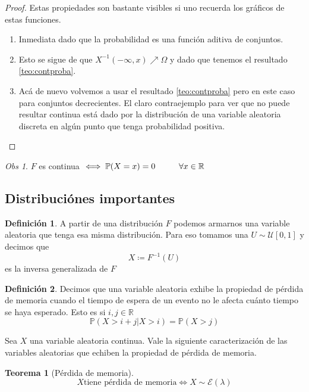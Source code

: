 \documentclass[11pt]{article}
\theoremstyle{plain} %
\newtheorem{teorema}{\color{rojo}Teorema}
\theoremstyle{definition}
\newtheorem*{definicion}{Definici\'{o}n} %
\theoremstyle{remark}
\newtheorem{obs}{Obs}
\def\Om{\Omega}
\def\R{\mathbb{R}}
\def\P{\mathbb{P}}
\def\va{variable aleatoria }
\def\vas{variables aleatorias }
\def\blue{\textcolor{blue!60!black}}
\begin{document}
\begin{proof}
Estas propiedades son bastante visibles si uno recuerda los gr\'aficos de estas funciones.
	\begin{enumerate}
		\item Inmediata dado que la probabilidad es una funci\'on aditiva de conjuntos.
		\item Esto se sigue de que $X^{-1}(-\infty, x) \nearrow \Om$ y dado que tenemos el resultado \ref{teo:contproba}.
		\item Ac\'a de nuevo volvemos a usar el resultado \ref{teo:contproba} pero en este caso para conjuntos decrecientes. El claro contraejemplo para ver que no puede resultar continua est\'a dado por la distribuci\'on de una \va discreta en alg\'un punto que tenga probabilidad positiva.
	\end{enumerate}
\end{proof}

\begin{obs}
	$F$ es continua $\iff \P(X=x) = 0 \hskip 1cm \forall x \in \R$ 
\end{obs}

\bigskip

\subsection{Distribuci\'ones importantes}

\begin{definicion}
	
	A partir de una distribuci\'on $F$ podemos armarnos una \va que tenga esa misma distribuci\'on. Para eso tomamos una $U \sim \mathcal{U}[0,1] $ y decimos que \[X \coloneqq F^{-1}(U)\]
	es la \blue{inversa generalizada} de $F$
\end{definicion}

\begin{definicion}
	\label{def:permem}
	Decimos que una \va exhibe la propiedad de \blue{p\'erdida de memoria} cuando el tiempo de espera de un evento no le afecta cu\'anto tiempo se haya esperado. Esto es si $i,j \in \R$
	\[\P(X>i+j | X > i) = \P(X>j)  \]
\end{definicion}

Sea $X$ una \va continua. Vale la siguiente caracterizaci\'on de las \vas que echiben la propiedad de pérdida de memoria.

\begin{teorema}
	[P\'erdida de memoria]
	
	\[X \text{tiene p\'erdida de memoria} \iff X \sim \mathcal{E}(\lambda) \]
\end{teorema}
\end{document}
